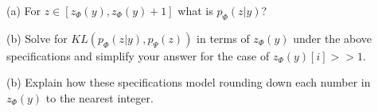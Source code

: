 \documentclass{article}
\newcommand{\solution}[1]{}
\begin{document}
\medskip
(a) For $z \in [z_\Phi(y),z_\Phi(y)+1]$ what is $p_\Phi(z|y)$?

\solution{1}

\medskip
(b) Solve for $KL(p_\Phi(z|y),p_\Psi(z))$ in terms of $z_\Phi(y)$ under the above specifications and simplify your answer
for the case of $z_\Phi(y)[i] >> 1$.

\solution{
\begin{eqnarray*}
  & & KL(p_\Phi(z|y),p_\Psi(z)) \\
  \\
  & = & E_{z \sim P_\Phi(z|y)}\;\ln\frac{p_\Phi(z_\Phi(y)}{p_\Psi(z)} \\
  \\
  & = & E_{z \sim P_\Phi(z|y)} \;\sum_i \ln \frac{1}{1/(s_{\mathrm{max}}z[i])} \\
  \\
  & = & \sum_i E_{z[i]}\;\ln (s_{\mathrm{max}}z[i]) \\
  \\
  & = & \left(\sum_i \int_{z_\Phi(y)[i]}^{z_\Phi(y)[i]+1} \ln z\; dz\right) + d \ln s_{\mathrm{max}} \\
  \\
  & = & \left(\sum_i [z\ln z - z]_{z_\Phi(y)[i]}^{z_\Phi(y)[i]+1} \right) + d \ln s_{\mathrm{max}}
  \\
  & = & \left(\sum_i [z\ln z]_{z_\Phi(y)[i]}^{z_\Phi(y)[i]+1} \right) + d \ln s_{\mathrm{max}} - 1 \\
  \\
  & = & \left(\sum_i \ln (z_\Phi(y)[i] + 1) + z_\Phi(y)[i](\ln (z_\Phi(y)[i] + 1) - \ln z_\Phi(y)[i]) \right) + d \ln s_{\mathrm{max}} - 1 \\
  \\
  & = & \left(\sum_i \ln (z_\Phi(y)[i] + 1) + z_\Phi(y)[i]\ln \left(1+ \frac{1}{z_\Phi(y)[i]}\right) \right) + d \ln s_{\mathrm{max}} - 1 \\
  \\
  & \approx & \left(\sum_i \ln z_\Phi(y)[i] \right) + d \ln s_{\mathrm{max}} \;\;\;\mbox{for $z_\Phi(y)[i] >> 1$}
\end{eqnarray*}
}

\medskip
(b) Explain how these specifications model rounding down each number in $z_\Phi(y)$ to the nearest integer.
\end{document}
